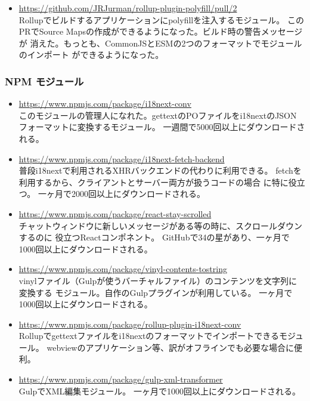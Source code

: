 \documentclass{res}
\begin{document}
\begin{resume}
\begin{itemize}
  \item \url{https://github.com/JRJurman/rollup-plugin-polyfill/pull/2} \\
  Rollupでビルドするアプリケーションにpolyfillを注入するモジュール。
  このPRでSource Mapsの作成ができるようになった。ビルド時の警告メッセージが
  消えた。もっとも、CommonJSとESMの2つのフォーマットでモジュールのインポート
  ができるようになった。
\end{itemize}

\subsubsection{NPM モジュール}

\begin{itemize}
  \item \url{https://www.npmjs.com/package/i18next-conv} \\
  このモジュールの管理人になれた。gettextのPOファイルをi18nextのJSON
  フォーマットに変換するモジュール。
  一週間で5000回以上にダウンロードされる。

  \item \url{https://www.npmjs.com/package/i18next-fetch-backend} \\
  普段i18nextで利用されるXHRバックエンドの代わりに利用できる。
  fetchを利用するから、クライアントとサーバー両方が扱うコードの場合
  に特に役立つ。
  一ヶ月で2000回以上にダウンロードされる。

  \item \url{https://www.npmjs.com/package/react-stay-scrolled} \\
  チャットウィンドウに新しいメッセージがある等の時に、スクロールダウンするのに
  役立つReactコンポネント。
  GitHubで34の星があり、一ヶ月で1000回以上にダウンロードされる。

  \item \url{https://www.npmjs.com/package/vinyl-contents-tostring} \\
  vinylファイル（Gulpが使うバーチャルファイル）のコンテンツを文字列に変換する
  モジュール。自作のGulpプラグインが利用している。
  一ヶ月で1000回以上にダウンロードされる。

  \item \url{https://www.npmjs.com/package/rollup-plugin-i18next-conv} \\
  Rollupでgettextファイルをi18nextのフォーマットでインポートできるモジュール。
  webviewのアプリケーション等、訳がオフラインでも必要な場合に便利。

  \item \url{https://www.npmjs.com/package/gulp-xml-transformer} \\
  GulpでXML編集モジュール。
  一ヶ月で1000回以上にダウンロードされる。
\end{itemize}


\end{resume}
\end{document}

